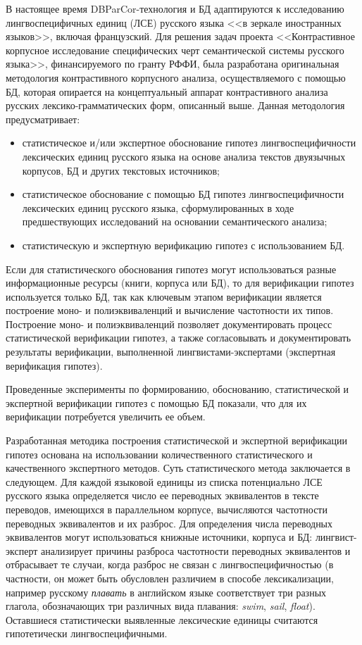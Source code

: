 \begin{multicols}{2}
  В настоящее время DBParCor-технология и БД адаптируются к
исследованию лингвоспецифичных единиц (ЛСЕ) русского языка <<в зеркале
иностранных языков>>, включая французский. Для решения задач проекта
<<Контрастивное корпусное исследование специфических черт семантической
системы русского языка>>, финансируемого по гранту РФФИ, была
разработана оригинальная методология контрастивного корпусного анализа,
осуществляемого с помощью БД, которая опирается на концептуальный
аппарат контрастивного анализа русских лек\-си\-ко-грам\-ма\-ти\-че\-ских
форм, описанный выше. Данная методология предусматривает:
  \begin{itemize}
\item статистическое и/или экспертное обоснование гипотез
лингвоспецифичности лексических единиц русского языка на основе анализа
текстов двуязычных корпусов, БД и других текстовых источников;
\item статистическое обоснование с помощью БД гипотез
лингвоспецифичности лексических единиц русского языка,
сформулированных в ходе предшествующих исследований на основании
семантического анализа;
\item статистическую и экспертную верификацию гипотез с использованием
БД.
  \end{itemize}

  Если для статистического обоснования гипотез могут использоваться разные
информационные ресурсы (книги, корпуса или БД), то для верификации
гипотез используется только БД, так как ключевым этапом верификации
является по\-стро\-ение моно- и полиэквиваленций и вычисление час\-тот\-ности их
типов. Построение моно- и полиэквиваленций позволяет документировать
процесс статистической верификации гипотез, а также согласовывать и
документировать результаты верификации, выполненной лингвис\-та\-ми-экс\-пер\-та\-ми (экспертная верификация гипотез).

  Проведенные эксперименты по формированию, обоснованию,
статистической и экспертной верификации гипотез с помощью БД показали,
что для их верификации потребуется увеличить ее \mbox{объем}.

  Разработанная методика построения статистической и экспертной
верификации гипотез основана на использовании количественного
статистического и качественного экспертного методов. Суть статистического
метода заключается в следующем. Для каждой языковой единицы из списка
потенциально ЛСЕ русского языка определяется чис\-ло
ее переводных эквивалентов в тексте переводов, имеющихся в параллельном
корпусе, вычисляются час\-тот\-ности переводных эквивалентов и их разброс. Для
определения чис\-ла переводных эквивалентов могут использоваться книжные
источники, корпуса и БД: линг\-вист-экс\-перт анализирует причины разброса
частотности переводных эквивалентов и отбрасывает те случаи, когда разброс
не связан с лингвоспецифичностью (в частности, он может быть обусловлен
различием в способе лексикализации, например русскому \textit{плавать} в
английском языке соответствует три разных глагола, обозначающих три
различных вида плавания: \textit{swim}, \textit{sail}, \textit{float}). Оставшиеся
статистически выявленные лексические единицы считаются гипотетически
лингвоспецифичными.


\end{multicols}
